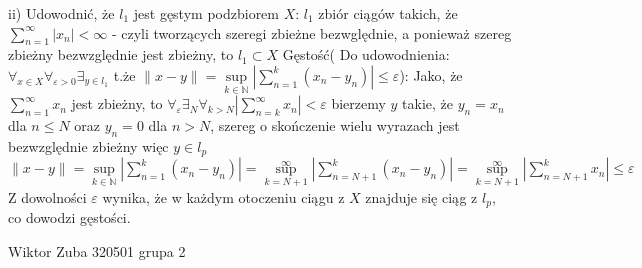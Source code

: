 \documentclass{article}
\begin{document}
ii) Udowodnić, że $l_1$ jest gęstym podzbiorem $X$:\newline
$l_1$ zbiór ciągów takich, że $\sum\limits_{n=1}^{\infty}|x_n|<\infty$ - czyli tworzących szeregi zbieżne bezwględnie, a ponieważ szereg zbieżny bezwzględnie jest zbieżny, to
$l_1\subset X$\newline
Gęstość( Do udowodnienia:
$\forall_{x\in X}\forall_{\varepsilon>0}\exists_{y\in l_1}$ t.że $\lVert x-y\rVert=\sup\limits_{k\in\mathbb{N}}|\sum\limits_{n=1}^{k}(x_n-y_n)|\le\varepsilon$):\newline
Jako, że $\sum\limits_{n=1}^{\infty}x_n$ jest zbieżny, to $\forall_{\varepsilon}\exists_{N}\forall_{k>N}|\sum\limits_{n=k}^{\infty}x_n|<\varepsilon$\newline
bierzemy $y$ takie, że $y_n=x_n$ dla $n\le N$ oraz $y_n=0$ dla $n>N$, szereg o skończenie wielu wyrazach jest bezwzględnie zbieżny więc $y\in l_p$\newline
$\lVert x-y\rVert=\sup\limits_{k\in\mathbb{N}}|\sum\limits_{n=1}^{k}(x_n-y_n)|=\sup\limits_{k=N+1}^{\infty}|\sum\limits_{n=N+1}^{k}(x_n-y_n)|=
\sup\limits_{k=N+1}^{\infty}|\sum\limits_{n=N+1}^{k}x_n|\le\varepsilon$\newline
Z dowolności $\varepsilon$ wynika, że w każdym otoczeniu ciągu z $X$ znajduje się ciąg z $l_p$, co dowodzi gęstości.\newpage

Wiktor Zuba 320501 grupa 2
\newline
\end{document}
